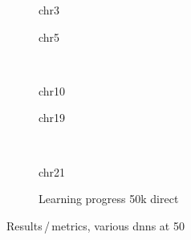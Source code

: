 \begin{figure}[p]%
    \begin{subfigure}{0.45\textwidth}
        \scriptsize
        \caption{chr3}
    \end{subfigure} \hfill
    \begin{subfigure}{0.45\textwidth}
        \scriptsize
        \caption{chr5}
    \end{subfigure}\\[5mm]
    \begin{subfigure}{0.45\textwidth}
        \scriptsize
        \caption{chr10}
    \end{subfigure}\hfill
    \begin{subfigure}{0.45\textwidth}
        \scriptsize
        \caption{chr19}
    \end{subfigure}\\[3mm]
    \begin{subfigure}{0.45\textwidth}
        \scriptsize
        \caption{chr21}
    \end{subfigure}\hfill
    \begin{subfigure}{0.45\textwidth}
        \caption{Learning progress 50k direct} \label{fig:results:50k_lossEpochs}
    \end{subfigure}
    \caption{Results\,/\,metrics, various \acrshort{dnn}s at \SI{50}{\kilo\bp}} \label{fig:results:DNN50k_pearson}
\end{figure}
